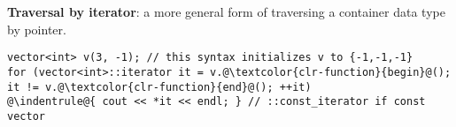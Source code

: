 \documentclass[6.6pt, twocolumn]{extarticle}
\newcommand{\myinline}[1]{\lstinline[basicstyle={\fontsize{5pt}{6}\ttfamily}]{#1}}
\begin{document}
\smallskip
\begin{minipage}[h]{3.35cm} 
   \textbf{Traversal by iterator}: a more general form of traversing a container data type by pointer.
    \end{minipage}
   \begin{minipage}[c]{6.9cm}
       \begin{tcolorbox}[top=-4pt,bottom=-4pt,left=-7.5pt,right=0pt,]
              {
              \begin{lstlisting}[style = mystyle]
vector<int> v(3, -1); // this syntax initializes v to {-1,-1,-1}
for (vector<int>::iterator it = v.@\textcolor{clr-function}{begin}@(); it != v.@\textcolor{clr-function}{end}@(); ++it)
@\indentrule@{ cout << *it << endl; } // ::const_iterator if const vector
\end{lstlisting}
}
\end{tcolorbox}
\end{minipage}
\end{document}
